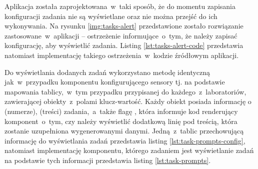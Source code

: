 Aplikacja została zaprojektowana~w~taki sposób, że do momentu zapisania konfiguracji zadania nie są
wyświetlane oraz nie można przejść do ich wykonywania. Na rysunku \ref{img:tasks-alert}
przedstawione zostało rozwiązanie zastosowane~w~aplikacji -- ostrzeżenie informujące~o~tym, że
należy zapisać konfigurację, aby wyświetlić zadania. Listing \ref{lst:tasks-alert-code} przedstawia
natomiast implementację takiego ostrzeżenia~w~kodzie źródłowym aplikacji.



Do wyświetlania dodanych zadań wykorzystano metodę identyczną jak~w~przypadku komponentu
konfigurującego sensory tj. na podstawie mapowania tablicy,~w~tym przypadku przypisanej
do każdego~z~laboratoriów, zawierającej obiekty~z~polami klucz-wartość. Każdy obiekt posiada
informację o  (numerze),  (treści) zadania,~a~także flagę
, która informuje kod renderujący komponent~o~tym, czy należy wyświetlić dodatkową
linię pod treścią, która zostanie uzupełniona wygenerowanymi danymi. Jedną~z~tablic przechowującą
informację do wyświetlania zadań przedstawia listing \ref{lst:task-prompts-config}, natomiast
implementację komponentu, którego zadaniem jest wyświetlanie zadań na podstawie tych informacji
przedstawia listing \ref{lst:task-prompts}.


